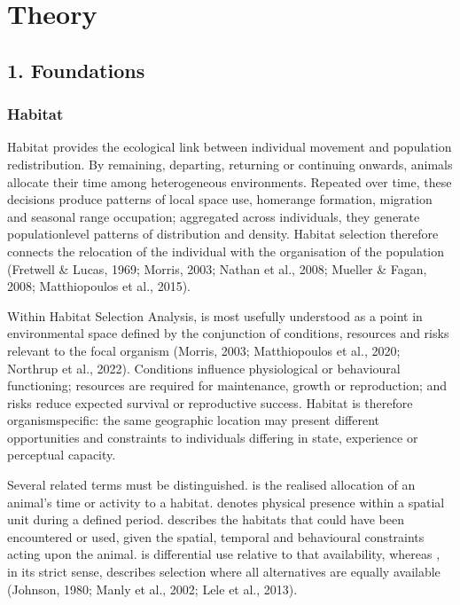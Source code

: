 \documentclass[letterpaper,10pt,english]{sphinxmanual}
\begin{document}
\sphinxstepscope


\chapter{Theory}
\label{\detokenize{theory:theory}}\label{\detokenize{theory::doc}}

\section{1. Foundations}
\label{\detokenize{theory:foundations}}

\subsection{Habitat}
\label{\detokenize{theory:habitat}}
\sphinxAtStartPar
Habitat provides the ecological link between individual movement and population redistribution. By remaining, departing, returning or continuing onwards, animals allocate their time among heterogeneous environments. Repeated over time, these decisions produce patterns of local space use, home\sphinxhyphen{}range formation, migration and seasonal range occupation; aggregated across individuals, they generate population\sphinxhyphen{}level patterns of distribution and density. Habitat selection therefore connects the relocation of the individual with the organisation of the population (Fretwell \& Lucas, 1969; Morris, 2003; Nathan et al., 2008; Mueller \& Fagan, 2008; Matthiopoulos et al., 2015).

\sphinxAtStartPar
Within Habitat Selection Analysis,  is most usefully understood as a point in environmental space defined by the conjunction of conditions, resources and risks relevant to the focal organism (Morris, 2003; Matthiopoulos et al., 2020; Northrup et al., 2022). Conditions influence physiological or behavioural functioning; resources are required for maintenance, growth or reproduction; and risks reduce expected survival or reproductive success. Habitat is therefore organism\sphinxhyphen{}specific: the same geographic location may present different opportunities and constraints to individuals differing in state, experience or perceptual capacity.

\sphinxAtStartPar
Several related terms must be distinguished.  is the realised allocation of an animal’s time or activity to a habitat.  denotes physical presence within a spatial unit during a defined period.  describes the habitats that could have been encountered or used, given the spatial, temporal and behavioural constraints acting upon the animal.  is differential use relative to that availability, whereas , in its strict sense, describes selection where all alternatives are equally available (Johnson, 1980; Manly et al., 2002; Lele et al., 2013).
\end{document}
